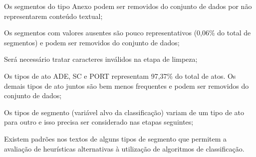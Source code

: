 \begin{alineas}
	\item Os segmentos do tipo Anexo podem ser removidos do conjunto de dados por não representarem conteúdo textual;
	\item Os segmentos com valores ausentes são pouco representativos (0,06\% do total de segmentos) e podem ser removidos do conjunto de dados;
	\item Será necessário tratar caracteres inválidos na etapa de limpeza;
	\item Os tipos de ato ADE, SC e PORT representam 97,37\% do total de atos. Os demais tipos de ato juntos são bem menos frequentes e podem ser removidos do conjunto de dados;	 
	\item Os tipos de segmento (variável alvo da classificação) variam de um tipo de ato para outro e isso precisa ser considerado nas etapas seguintes;
	\item Existem padrões nos textos de alguns tipos de segmento que permitem a avaliação de heurísticas alternativas à utilização de algoritmos de classificação.
\end{alineas}

